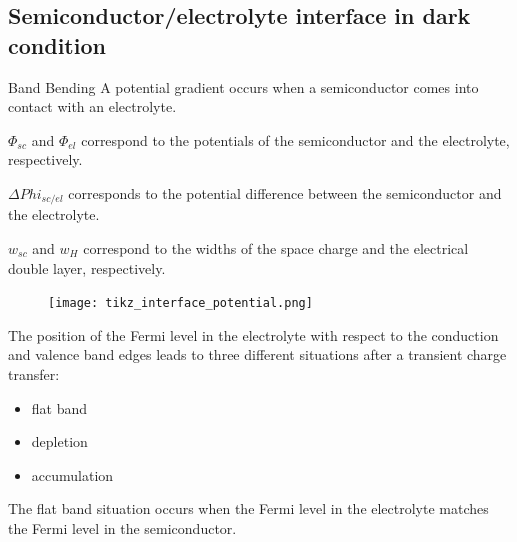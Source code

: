 \documentclass[10pt,compress]{beamer}
\begin{document}
\subsection{Semiconductor/electrolyte interface in dark condition}
    \begin{frame}[allowframebreaks=1.0]{Band Bending}
            A potential gradient occurs when a semiconductor comes into contact with an 
            electrolyte.
            
            $\Phi_{sc}$ and $\Phi_{el}$ correspond to the 
            potentials of the semiconductor and the electrolyte, respectively. 
            
            $\Delta Phi _{sc/el}$ corresponds to the potential difference between 
            the semiconductor and the electrolyte. 
            
            $w_{sc}$ and $w_{H}$ correspond to 
            the widths of the space charge and the electrical double layer, 
            respectively.

        \begin{figure}[h]
            \centering
            \texttt{[image: tikz\_interface\_potential.png]}
            \label{fig_interface_potential}
        \end{figure}

        \framebreak
            
        The position of the Fermi level in the electrolyte with respect to the 
        conduction and valence band edges leads to three different situations after 
         a transient charge transfer:
        \begin{itemize}
            \item flat band
            \item depletion
            \item accumulation
        \end{itemize}
        
        The flat band situation occurs when the Fermi level in the electrolyte 
        matches the Fermi level in the semiconductor. 
        

\end{frame}
\end{document}
